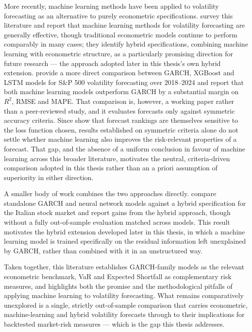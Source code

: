 \documentclass[12pt,a4paper]{article}
\begin{document}
More recently, machine learning methods have been applied to volatility
forecasting as an alternative to purely econometric specifications.
\citet{gunnarsson2024} survey this literature and report that machine learning
methods for volatility forecasting are generally effective, though traditional
econometric models continue to perform comparably in many cases; they identify
hybrid specifications, combining machine learning with econometric structure, as
a particularly promising direction for future research --- the approach adopted
later in this thesis's own hybrid extension. \citet{misra2025} provide a more
direct comparison between GARCH, XGBoost and LSTM models for S\&P 500 volatility
forecasting over 2018--2024 and report that both machine learning models
outperform GARCH by a substantial margin on $R^2$, RMSE and MAPE. That
comparison is, however, a working paper rather than a peer-reviewed study, and
it evaluates forecasts only against symmetric accuracy criteria. Since
\citet{poon2003} show that forecast rankings are themselves sensitive to the
loss function chosen, results established on symmetric criteria alone do not
settle whether machine learning also improves the risk-relevant properties of a
forecast. That gap, and the absence of a uniform conclusion in favour of machine
learning across this broader literature, motivates the neutral, criteria-driven
comparison adopted in this thesis rather than an a priori assumption of
superiority in either direction.

A smaller body of work combines the two approaches directly.
\citet{kartsonakis2021} compare standalone GARCH and neural network models
against a hybrid specification for the Italian stock market and report gains
from the hybrid approach, though without a fully out-of-sample evaluation
matched across models. This result motivates the hybrid extension developed
later in this thesis, in which a machine learning model is trained specifically
on the residual information left unexplained by GARCH, rather than combined
with it in an unstructured way.

Taken together, this literature establishes GARCH-family models as the relevant
econometric benchmark, VaR and Expected Shortfall as complementary risk measures,
and highlights both the promise and the methodological pitfalls of applying
machine learning to volatility forecasting. What remains comparatively unexplored
is a single, strictly out-of-sample comparison that carries econometric,
machine-learning and hybrid volatility forecasts through to their implications
for backtested market-risk measures --- which is the gap this thesis addresses.
\end{document}
